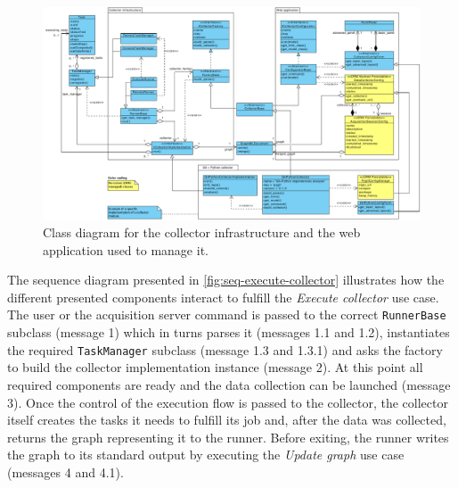 \begin{figure}[p] 
  \centering
  \includegraphics[height=0.93\linewidth,angle=90,origin=c]{images/class-collector}
  \caption[Class diagram for the data collection infrastructure.]{Class diagram for the collector infrastructure and the web application used to manage it.}
  \label{fig:class-collector}
\end{figure}

The sequence diagram presented in \vref{fig:seq-execute-collector} illustrates how the different presented components interact to fulfill the \emph{Execute collector} use case. The user or the acquisition server command is passed to the correct \texttt{Runner\BreakableSlash{}Base} subclass (message 1) which in turns parses it (messages 1.1 and 1.2), instantiates the required \texttt{TaskManager} subclass (message 1.3 and 1.3.1) and asks the factory to build the collector implementation instance (message 2). At this point all required components are ready and the data collection can be launched (message 3). Once the control of the execution flow is passed to the collector, the collector itself creates the tasks it needs to fulfill its job and, after the data was collected, returns the graph representing it to the runner. Before exiting, the runner writes the graph to its standard output by executing the \emph{Update graph} use case (messages 4 and 4.1).

